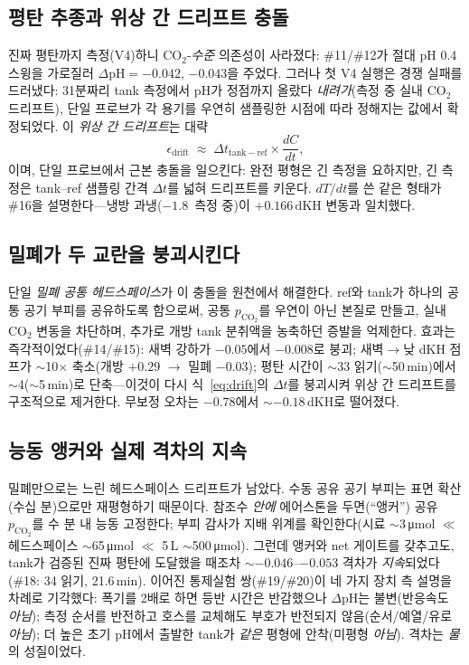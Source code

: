 \documentclass[11pt]{article}
\newcommand{\dpH}{\ensuremath{\Delta\mathrm{pH}}}
\newcommand{\dkh}{\ensuremath{\,\mathrm{dKH}}}
\newcommand{\co}{\ensuremath{\mathrm{CO_2}}}
\newcommand{\pco}{\ensuremath{p_{\mathrm{CO_2}}}}
\begin{document}
\subsection{평탄 추종과 위상 간 드리프트 충돌}
진짜 평탄까지 측정(V4)하니 \co{}-\emph{수준} 의존성이 사라졌다: \#11/\#12가 절대
pH 0.4 스윙을 가로질러 $\dpH=-0.042$, $-0.043$을 주었다. 그러나 첫 V4 실행은 경쟁
실패를 드러냈다: 31분짜리 tank 측정에서 pH가 정점까지 올랐다 \emph{내려가}(측정 중
실내 \co{} 드리프트), 단일 프로브가 각 용기를 우연히 샘플링한 시점에 따라 정해지는
값에서 확정되었다. 이 \emph{위상 간 드리프트}는 대략
\begin{equation}
\epsilon_\mathrm{drift} \;\approx\; \Delta t_{\mathrm{tank{-}ref}}\times \frac{dC}{dt},
\label{eq:drift}
\end{equation}
이며, 단일 프로브에서 근본 충돌을 일으킨다: 완전 평형은 긴 측정을 요하지만, 긴
측정은 tank--ref 샘플링 간격 $\Delta t$를 넓혀 드리프트를 키운다. $dT/dt$를 쓴 같은
형태가 \#16을 설명한다---냉방 과냉($-1.8$\,\textcelsius{} 측정 중)이 $+0.166\dkh$ 변동과
일치했다.

\subsection{밀폐가 두 교란을 붕괴시킨다}
단일 \emph{밀폐 공통 헤드스페이스}가 이 충돌을 원천에서 해결한다. ref와 tank가 하나의
공통 공기 부피를 공유하도록 함으로써, 공통 \pco{}를 우연이 아닌 본질로 만들고, 실내
\co{} 변동을 차단하며, 추가로 개방 tank 분취액을 농축하던 증발을 억제한다. 효과는
즉각적이었다(\#14/\#15): 새벽 강하가 $-0.05$에서 $-0.008$로 붕괴; 새벽$\to$낮 dKH
점프가 $\sim$10$\times$ 축소(개방 $+0.29$ $\to$ 밀폐 $-0.03$); 평탄 시간이 $\sim$33
읽기($\sim$50\,min)에서 $\sim$4($\sim$5\,min)로 단축---이것이 다시
식~\eqref{eq:drift}의 $\Delta t$를 붕괴시켜 위상 간 드리프트를 구조적으로 제거한다.
무보정 오차는 $-0.78$에서 $\sim-0.18\dkh$로 떨어졌다.

\subsection{능동 앵커와 실제 격차의 지속}
밀폐만으로는 느린 헤드스페이스 드리프트가 남았다. 수동 공유 공기 부피는 표면 확산
(수십 분)으로만 재평형하기 때문이다. 참조수 \emph{안에} 에어스톤을 두면(``앵커'')
공유 \pco{}를 수 분 내 능동 고정한다; 부피 감사가 지배 위계를 확인한다(시료
$\sim$3\,\si{\micro mol} $\ll$ 헤드스페이스 $\sim$65\,\si{\micro mol} $\ll$ 5\,L
$\sim$500\,\si{\micro mol}). 그런데 앵커와 net 게이트를 갖추고도, tank가 검증된 진짜
평탄에 도달했을 때조차 $\sim$$-0.046$--$-0.053$ 격차가 \emph{지속}되었다(\#18: 34
읽기, 21.6\,min). 이어진 통제실험 쌍(\#19/\#20)이 네 가지 장치 측 설명을 차례로
기각했다: 폭기를 2배로 하면 등반 시간은 반감했으나 \dpH{}는 불변(반응속도 \emph{아님});
측정 순서를 반전하고 호스를 교체해도 부호가 반전되지 않음(순서/예열/유로 \emph{아님});
더 높은 초기 pH에서 출발한 tank가 \emph{같은} 평형에 안착(미평형 \emph{아님}). 격차는 \emph{물}의
성질이었다.
\end{document}
